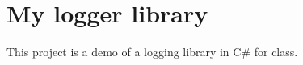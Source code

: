 \chapter{My logger library}
\hypertarget{md__r_e_a_d_m_e}{}\label{md__r_e_a_d_m_e}
\label{md__r_e_a_d_m_e_autotoc_md0}%
%


This project is a demo of a logging library in C\# for class. 